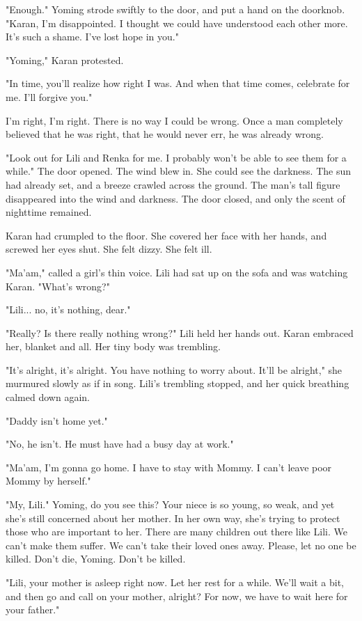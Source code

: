"Enough." Yoming strode swiftly to the door, and put a hand on the
doorknob. "Karan, I'm disappointed. I thought we could have understood
each other more. It's such a shame. I've lost hope in you."

"Yoming," Karan protested.

"In time, you'll realize how right I was. And when that time comes,
celebrate for me. I'll forgive you."

I'm right, I'm right. There is no way I could be wrong. Once a man
completely believed that he was right, that he would never err, he was
already wrong.

"Look out for Lili and Renka for me. I probably won't be able to see
them for a while." The door opened. The wind blew in. She could see the
darkness. The sun had already set, and a breeze crawled across the
ground. The man's tall figure disappeared into the wind and darkness.
The door closed, and only the scent of nighttime remained.

Karan had crumpled to the floor. She covered her face with her hands,
and screwed her eyes shut. She felt dizzy. She felt ill.

"Ma'am," called a girl's thin voice. Lili had sat up on the sofa and was
watching Karan. "What's wrong?"

"Lili... no, it's nothing, dear."

"Really? Is there really nothing wrong?" Lili held her hands out. Karan
embraced her, blanket and all. Her tiny body was trembling.

"It's alright, it's alright. You have nothing to worry about. It'll be
alright," she murmured slowly as if in song. Lili's trembling stopped,
and her quick breathing calmed down again.

"Daddy isn't home yet."

"No, he isn't. He must have had a busy day at work."

"Ma'am, I'm gonna go home. I have to stay with Mommy. I can't leave poor
Mommy by herself."

"My, Lili." Yoming, do you see this? Your niece is so young, so weak,
and yet she's still concerned about her mother. In her own way, she's
trying to protect those who are important to her. There are many
children out there like Lili. We can't make them suffer. We can't take
their loved ones away. Please, let no one be killed. Don't die, Yoming.
Don't be killed.

"Lili, your mother is asleep right now. Let her rest for a while. We'll
wait a bit, and then go and call on your mother, alright? For now, we
have to wait here for your father."

